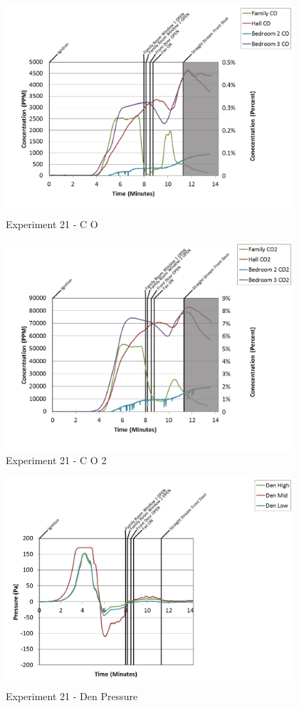 \documentclass{article}
\begin{document}
\begin{appendices}
\clearpage

\begin{figure}[h!]
	\centering
	\includegraphics[height=3.05in]{0_Images/Results_Charts/Exp_21_Charts/CO.png}
	\caption{Experiment 21 - C O}
\end{figure}


\begin{figure}[h!]
	\centering
	\includegraphics[height=3.05in]{0_Images/Results_Charts/Exp_21_Charts/CO2.png}
	\caption{Experiment 21 - C O 2}
\end{figure}

\clearpage

\begin{figure}[h!]
	\centering
	\includegraphics[height=3.05in]{0_Images/Results_Charts/Exp_21_Charts/DenPressure.png}
	\caption{Experiment 21 - Den Pressure}
\end{figure}



\end{appendices}
\end{document}
